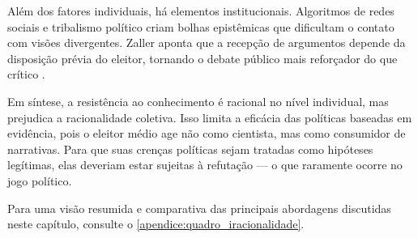 Além dos fatores individuais, há elementos institucionais. Algoritmos de redes sociais e tribalismo político criam bolhas epistêmicas que dificultam o contato com visões divergentes. Zaller aponta que a recepção de argumentos depende da disposição prévia do eleitor, tornando o debate público mais reforçador do que crítico \cite{zaller1992nature}.

Em síntese, a resistência ao conhecimento é racional no nível individual, mas prejudica a racionalidade coletiva. Isso limita a eficácia das políticas baseadas em evidência, pois o eleitor médio age não como cientista, mas como consumidor de narrativas. Para que suas crenças políticas sejam tratadas como hipóteses legítimas, elas deveriam estar sujeitas à refutação — o que raramente ocorre no jogo político.


Para uma visão resumida e comparativa das principais abordagens discutidas neste capítulo, consulte o \autoref{apendice:quadro_iracionalidade}.

